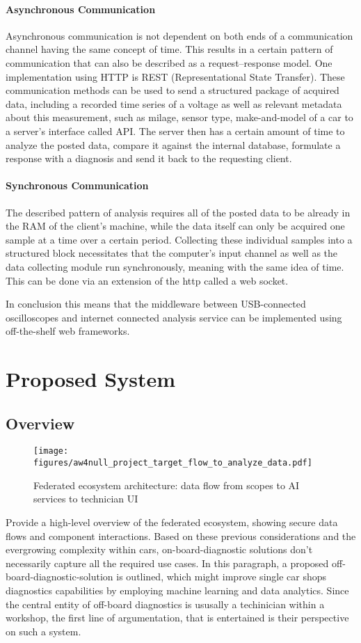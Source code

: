 \paragraph{Asynchronous Communication}
Asynchronous communication is not dependent on both ends of a communication channel having the same concept of time. 
This results in a certain pattern of communication that can also be described as a request–response model. 
One implementation using HTTP is REST (Representational State Transfer). 
These communication methods can be used to send a structured package of acquired data, including a recorded time series of a voltage as well as relevant metadata about this measurement, such as milage, sensor type, make-and-model of a car to a server’s interface called API. 
The server then has a certain amount of time to analyze the posted data, compare it against the internal database, formulate a response with a diagnosis and send it back to the requesting client.

\paragraph{Synchronous Communication}
The described pattern of analysis requires all of the posted data to be already in the RAM of the client’s machine, while the data itself can only be acquired one sample at a time over a certain period. 
Collecting these individual samples into a structured block necessitates that the computer’s input channel as well as the data collecting module run synchronously, meaning with the same idea of time. 
This can be done via an extension of the http called a web socket.

In conclusion this means that the middleware between USB-connected oscilloscopes and internet connected analysis service can be implemented using off-the-shelf web frameworks.

\section{Proposed System}
\subsection{Overview}
\begin{figure}[ht]
  \centering
  \texttt{[image: figures/aw4null\_project\_target\_flow\_to\_analyze\_data.pdf]}
  \caption{Federated ecosystem architecture: data flow from scopes to AI services to technician UI}
  \label{fig:system_architecture}
\end{figure}
Provide a high-level overview of the federated ecosystem, showing secure data flows and component interactions.
Based on these previous considerations and the evergrowing complexity within cars, on-board-diagnostic solutions don't necessarily capture all the required use cases.
In this paragraph, a proposed off-board-diagnostic-solution is outlined, which might improve single car shops diagnostics capabilities by employing machine learning and data analytics.
Since the central entity of off-board diagnostics is ususally a techinician within a workshop, the first line of argumentation, that is entertained is their perspective on such a system.

